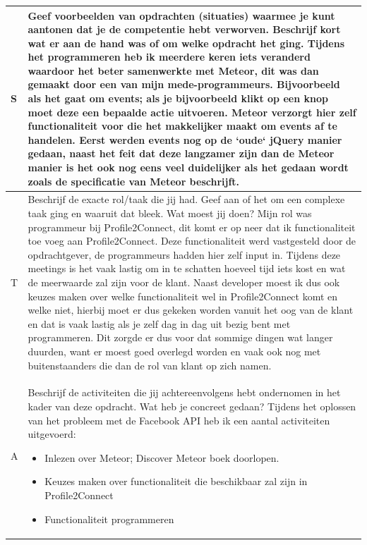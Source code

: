 \begin{tabularx}{\textwidth}{| l | X |}
S & Geef voorbeelden van opdrachten (situaties) waarmee je kunt aantonen dat je de competentie hebt verworven. Beschrijf kort wat er aan de hand was of om welke opdracht het ging.
\newline
\newline
Tijdens het programmeren heb ik meerdere keren iets veranderd waardoor het beter samenwerkte met Meteor, dit was dan gemaakt door een van mijn mede-programmeurs. Bijvoorbeeld als het gaat om events; als je bijvoorbeeld klikt op een knop moet deze een bepaalde actie uitvoeren. Meteor verzorgt hier zelf functionaliteit voor die het makkelijker maakt om events af te handelen. Eerst werden events nog op de `oude` jQuery manier gedaan, naast het feit dat deze langzamer zijn dan de Meteor manier is het ook nog eens veel duidelijker als het gedaan wordt zoals de specificatie van Meteor beschrijft.
\\
\hline
T & Beschrijf de exacte rol/taak die jij had. Geef aan of het om een complexe taak ging en waaruit dat bleek. Wat moest jij doen?
\newline
\newline
Mijn rol was programmeur bij Profile2Connect, dit komt er op neer dat ik functionaliteit toe voeg aan Profile2Connect. Deze functionaliteit werd vastgesteld door de opdrachtgever, de programmeurs hadden hier zelf input in. Tijdens deze meetings is het vaak lastig om in te schatten hoeveel tijd iets kost en wat de meerwaarde zal zijn voor de klant. Naast developer moest ik dus ook keuzes maken over welke functionaliteit wel in Profile2Connect komt en welke niet, hierbij moet er dus gekeken worden vanuit het oog van de klant en dat is vaak lastig als je zelf dag in dag uit bezig bent met programmeren. Dit zorgde er dus voor dat sommige dingen wat langer duurden, want er moest goed overlegd worden en vaak ook nog met buitenstaanders die dan de rol van klant op zich namen.
\\
\hline
A & Beschrijf de activiteiten die jij achtereenvolgens hebt ondernomen in het kader van deze opdracht. Wat heb je concreet gedaan?
\newline
\newline
Tijdens het oplossen van het probleem met de Facebook API heb ik een aantal activiteiten uitgevoerd:

\begin{itemize}
\item Inlezen over Meteor; Discover Meteor boek doorlopen.
\item Keuzes maken over functionaliteit die beschikbaar zal zijn in Profile2Connect
\item Functionaliteit programmeren
\end{itemize}


\end{tabularx}
